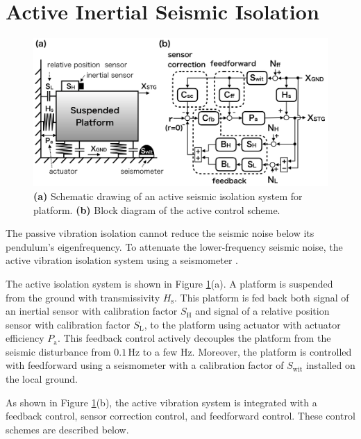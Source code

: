 \section{Active Inertial Seismic Isolation}\label{sec:52}
\begin{figure}[h]
 \begin{center}
    \includegraphics[width=13.5cm]{./img_chap5/img503.png}
    \caption{{\bf(a)} Schematic drawing of an active seismic isolation system for platform. {\bf(b)} Block diagram of the active control scheme.} \label{img:img503}
  \end{center}
\end{figure}
The passive vibration isolation cannot reduce the seismic noise below its pendulum's eigenfrequency. To attenuate the lower-frequency seismic noise, the active vibration isolation system using a seismometer \cite{matichard2015seismic}.

The active isolation system is shown in Figure \ref{img:img503}(a). A platform is suspended from the ground with transmissivity $H_{\mathrm{s}}$. This platform is fed back both signal of an inertial sensor with calibration factor $S_{\mathrm{H}}$ and signal of a relative position sensor with calibration factor $S_{\mathrm{L}}$, to the platform using actuator with actuator efficiency $P_{\mathrm{a}}$. This feedback control actively decouples the platform from the seismic disturbance from $0.1\,\mathrm{Hz}$ to a few Hz. Moreover, the platform is controlled with feedforward using a seismometer with a calibration factor of $S_{\mathrm{wit}}$ installed on the local ground. 

As shown in Figure \ref{img:img503}(b), the active vibration system is integrated with a feedback control, sensor correction control, and feedforward control. These control schemes are described below.

